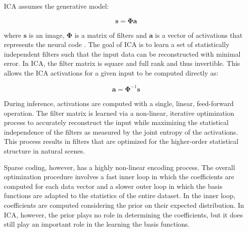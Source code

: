 ICA assumes the generative model:

\begin{equation}\label{eq:ch2_ica_generative_model}
  \mathbf{s} = \mathbf{\Phi a}
\end{equation}

where $\mathbf{s}$ is an image, $\mathbf{\Phi}$ is a matrix of filters and $\mathbf{a}$ is a vector of activations that represents the neural code \parencite{bell1997independent}. The goal of ICA is to learn a set of statistically independent filters such that the input data can be reconstructed with minimal error. In ICA, the filter matrix is square and full rank and thus invertible. This allows the ICA activations for a given input to be computed directly as:

\begin{equation}
\mathbf{\hat{a}} = \mathbf{\Phi}^{-1}\mathbf{s}
\end{equation}

During inference, activations are computed with a single, linear, feed-forward operation. The filter matrix is learned via a non-linear, iterative optimization process to accurately reconstruct the input while maximizing the statistical independence of the filters as measured by the joint entropy of the activations. This process results in filters that are optimized for the higher-order statistical structure in natural scenes.

Sparse coding, however, has a highly non-linear encoding process. The overall optimization procedure involves a fast inner loop in which the coefficients are computed for each data vector and a slower outer loop in which the basis functions are adapted to the statistics of the entire dataset. In the inner loop, coefficients are computed considering the prior on their expected distribution. In ICA, however, the prior plays no role in determining the coefficients, but it does still play an important role in the learning the basis functions.


